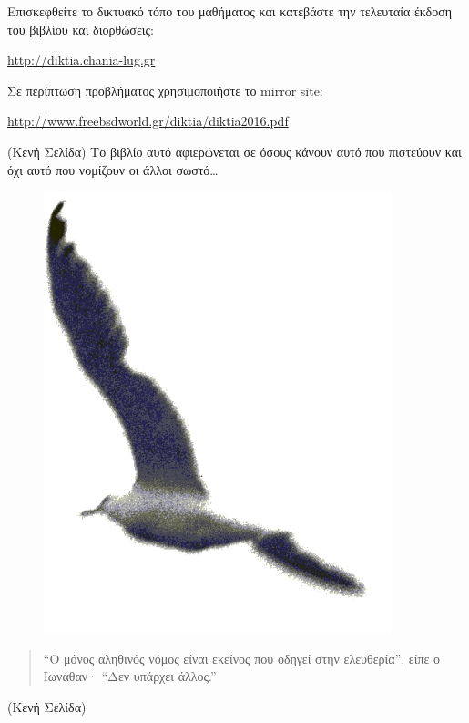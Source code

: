\bigskip
Επισκεφθείτε το δικτυακό τόπο του μαθήματος
και κατεβάστε την τελευταία έκδοση του βιβλίου και διορθώσεις:

\bigskip
\begin{center}
\url{http://diktia.chania-lug.gr}
\end{center}
\bigskip
Σε περίπτωση προβλήματος χρησιμοποιήστε το mirror site:
\bigskip
\begin{center}
\url{http://www.freebsdworld.gr/diktia/diktia2016.pdf}
\end{center}
\newpage
(Κενή Σελίδα)
\newpage
Το βιβλίο αυτό αφιερώνεται σε όσους κάνουν αυτό που πιστεύουν και όχι αυτό που νομίζουν οι άλλοι σωστό\ldots\\

\begin{figure}[!ht]
\includegraphics[width=0.9\textwidth]{images/intro/glaros}
\end{figure}
\begin{quote}
``Ο μόνος αληθινός νόμος είναι εκείνος που οδηγεί στην ελευθερία'', είπε ο Ιωνάθαν· ``Δεν υπάρχει άλλος.''

\end{quote}
\newpage
(Κενή Σελίδα)
\newpage
